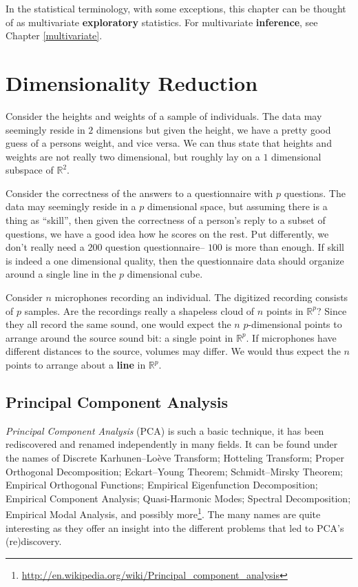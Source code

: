 \documentclass[]{book}
\theoremstyle{definition}
\theoremstyle{definition}
\theoremstyle{definition}
\theoremstyle{remark}
\let\BeginKnitrBlock\begin \let\EndKnitrBlock\end
\begin{document}
In the statistical terminology, with some exceptions, this chapter can
be thought of as multivariate \textbf{exploratory} statistics. For
multivariate \textbf{inference}, see Chapter \ref{multivariate}.

\section{Dimensionality Reduction}\label{dim-reduce}

\BeginKnitrBlock{example}
\protect\hypertarget{exm:bmi}{}{\label{exm:bmi} }Consider the heights and
weights of a sample of individuals. The data may seemingly reside in
\(2\) dimensions but given the height, we have a pretty good guess of a
persons weight, and vice versa. We can thus state that heights and
weights are not really two dimensional, but roughly lay on a \(1\)
dimensional subspace of \(\mathbb{R}^2\).
\EndKnitrBlock{example}

\BeginKnitrBlock{example}
\protect\hypertarget{exm:iq}{}{\label{exm:iq} }Consider the correctness of
the answers to a questionnaire with \(p\) questions. The data may
seemingly reside in a \(p\) dimensional space, but assuming there is a
thing as ``skill'', then given the correctness of a person's reply to a
subset of questions, we have a good idea how he scores on the rest. Put
differently, we don't really need a \(200\) question questionnaire--
\(100\) is more than enough. If skill is indeed a one dimensional
quality, then the questionnaire data should organize around a single
line in the \(p\) dimensional cube.
\EndKnitrBlock{example}

\BeginKnitrBlock{example}
\protect\hypertarget{exm:blind-signal}{}{\label{exm:blind-signal} }Consider
\(n\) microphones recording an individual. The digitized recording
consists of \(p\) samples. Are the recordings really a shapeless cloud
of \(n\) points in \(\mathbb{R}^p\)? Since they all record the same
sound, one would expect the \(n\) \(p\)-dimensional points to arrange
around the source sound bit: a single point in \(\mathbb{R}^p\). If
microphones have different distances to the source, volumes may differ.
We would thus expect the \(n\) points to arrange about a \textbf{line}
in \(\mathbb{R}^p\).
\EndKnitrBlock{example}

\subsection{Principal Component Analysis}\label{pca}

\emph{Principal Component Analysis} (PCA) is such a basic technique, it
has been rediscovered and renamed independently in many fields. It can
be found under the names of Discrete Karhunen--Loève Transform;
Hotteling Transform; Proper Orthogonal Decomposition; Eckart--Young
Theorem; Schmidt--Mirsky Theorem; Empirical Orthogonal Functions;
Empirical Eigenfunction Decomposition; Empirical Component Analysis;
Quasi-Harmonic Modes; Spectral Decomposition; Empirical Modal Analysis,
and possibly more\footnote{\url{http://en.wikipedia.org/wiki/Principal_component_analysis}}.
The many names are quite interesting as they offer an insight into the
different problems that led to PCA's (re)discovery.
\end{document}
